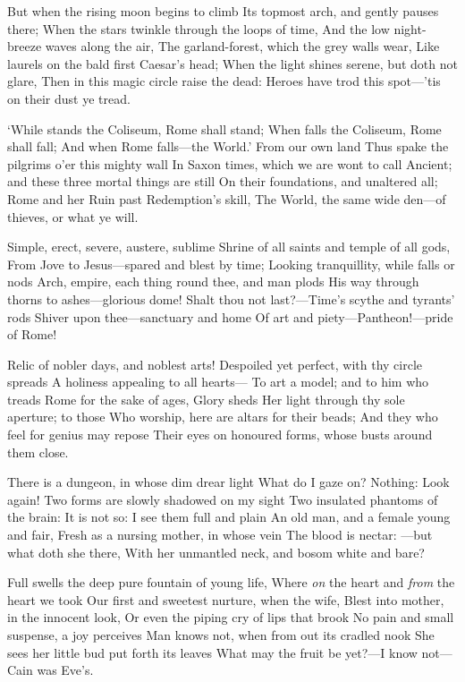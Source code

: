 \documentclass[10pt,twocolumn]{book}
\begin{document}
   But when the rising moon begins to climb
   Its topmost arch, and gently pauses there;
   When the stars twinkle through the loops of time,
   And the low night-breeze waves along the air,
   The garland-forest, which the grey walls wear,
   Like laurels on the bald first Caesar's head;
   When the light shines serene, but doth not glare,
   Then in this magic circle raise the dead:
Heroes have trod this spot---'tis on their dust ye tread.


   `While stands the Coliseum, Rome shall stand;
   When falls the Coliseum, Rome shall fall;
   And when Rome falls---the World.'  From our own land
   Thus spake the pilgrims o'er this mighty wall
   In Saxon times, which we are wont to call
   Ancient; and these three mortal things are still
   On their foundations, and unaltered all;
   Rome and her Ruin past Redemption's skill,
The World, the same wide den---of thieves, or what ye will.

   Simple, erect, severe, austere, sublime\textemdash
   Shrine of all saints and temple of all gods,
   From Jove to Jesus---spared and blest by time;
   Looking tranquillity, while falls or nods
   Arch, empire, each thing round thee, and man plods
   His way through thorns to ashes---glorious dome!
   Shalt thou not last?---Time's scythe and tyrants' rods
   Shiver upon thee---sanctuary and home
Of art and piety---Pantheon!---pride of Rome!


   Relic of nobler days, and noblest arts!
   Despoiled yet perfect, with thy circle spreads
   A holiness appealing to all hearts---
   To art a model; and to him who treads
   Rome for the sake of ages, Glory sheds
   Her light through thy sole aperture; to those
   Who worship, here are altars for their beads;
   And they who feel for genius may repose
Their eyes on honoured forms, whose busts around them close.


   There is a dungeon, in whose dim drear light
   What do I gaze on?  Nothing:  Look again!
   Two forms are slowly shadowed on my sight\textemdash
   Two insulated phantoms of the brain:
   It is not so:  I see them full and plain\textemdash
   An old man, and a female young and fair,
   Fresh as a nursing mother, in whose vein
   The blood is nectar: ---but what doth she there,
With her unmantled neck, and bosom white and bare?


   Full swells the deep pure fountain of young life,
   Where \textit{on} the heart and \textit{from} the heart we took
   Our first and sweetest nurture, when the wife,
   Blest into mother, in the innocent look,
   Or even the piping cry of lips that brook
   No pain and small suspense, a joy perceives
   Man knows not, when from out its cradled nook
   She sees her little bud put forth its leaves\textemdash
What may the fruit be yet?---I know not---Cain was Eve's.
\end{document}

